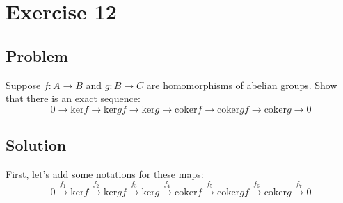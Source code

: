 \documentclass{article}
\begin{document}
\newpage
\section*{Exercise 12}
\subsection*{Problem}
Suppose $f: A \to B$ and $g: B \to C$ are homomorphisms of abelian groups.
Show that there is an exact sequence:
\begin{equation*}
0 \to \mathrm{ker}f \to \mathrm{ker}gf \to \mathrm{ker}g \to \mathrm{coker}f \to \mathrm{coker}gf \to \mathrm{coker}g \to 0 
\end{equation*}
\subsection*{Solution}
First, let's add some notations for these maps:
\begin{equation*}
0 \xrightarrow{f_1} \mathrm{ker}f \xrightarrow{f_2} \mathrm{ker}gf \xrightarrow{f_3} \mathrm{ker}g \xrightarrow{f_4} \mathrm{coker}f \xrightarrow{f_5} \mathrm{coker}gf \xrightarrow{f_6} \mathrm{coker}g \xrightarrow{f_7} 0 
\end{equation*}
\end{document}
